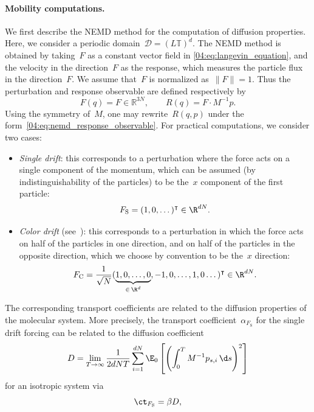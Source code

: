 \paragraph{Mobility computations.}
We first describe the NEMD method for the computation of diffusion properties.  Here, we consider a periodic domain~$\mathcal D = (L\mathbb{T})^d$.
The NEMD method is obtained by taking~$F$ as a constant vector field in \eqref{04:eq:langevin_equation}, and the velocity in the direction~$F$ as the response, which measures the particle flux in the direction~$F$. We assume that~$F$ is normalized as~$\| F \|=1$. Thus the perturbation and response observable are defined respectively by 
\begin{equation}
    \label{04:eq:mobility_force_flux}
    F(q) = F\in \mathbb{R}^{3N},\qquad R(q)= F\cdot M^{-1}p.
\end{equation}
Using the symmetry of~$M$, one may rewrite~$R(q,p)$ under the form~\eqref{04:eq:nemd_response_observable}. For practical computations, we consider two cases:
\begin{itemize}
    \item \emph{Single drift}: this corresponds to a perturbation where the force acts on a single component of the momentum, which can be assumed (by indistinguishability of the particles) to be the~$x$ component of the first particle: \begin{equation}\label{04:eq:single_drift}F_{\mathrm{S}}=(1,0,\dots)^\intercal \in \R^{dN}.\end{equation}
    \item \emph{Color drift} (see~\cite[Chapter 6]{EM08}): this corresponds to a perturbation in which the force acts on half of the particles in one direction, and on half of the particles in the opposite direction, which we choose by convention to be the~$x$ direction: \begin{equation}\label{04:eq:color_drift}F_{\mathrm{C}}=\frac1{\sqrt N}(\underbrace{1,0,\dots,0}_{\in\, \R^d},-1,0,\dots,1,0\dots)^\intercal \in \R^{dN}.\end{equation}
\end{itemize}
The corresponding transport coefficients are related to the diffusion properties of the molecular system. More precisely, the transport coefficient~$\alpha_{F_{\mathrm{S}}}$ for the single drift forcing can be related to the diffusion coefficient
\[D = \underset{T\to\infty}{\lim}\,\frac1{2dNT}\sum_{i=1}^{dN}\E_0\left[ \left(\int_0^T M^{-1}p_{s,i}\,\d s\right)^2\right]\]for an isotropic system via
\begin{equation}
    \label{04:eq:diffusion_coefficient}
    \ct_{F_{\mathrm S}} = \beta D,
\end{equation}
